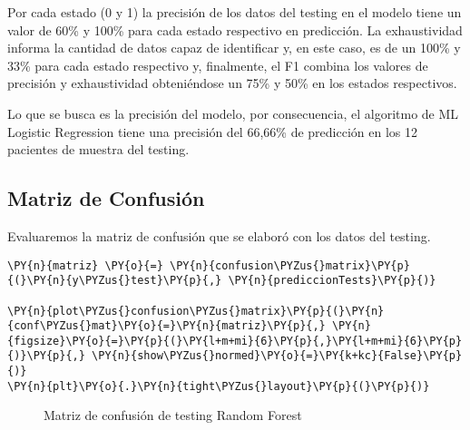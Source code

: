 	Por cada estado (0 y 1) la precisión de los datos del testing en el modelo tiene un valor de 60\%  y 100\% para cada estado respectivo en predicción. La exhaustividad informa la cantidad de datos capaz de identificar y, en este caso, es de un 100\% y 33\% para cada estado respectivo y, finalmente, el F1 combina los valores de precisión y exhaustividad obteniéndose un 75\% y 50\% en los estados respectivos. 
\par Lo que se busca es la precisión del modelo, por consecuencia, el algoritmo de ML Logistic Regression tiene una precisión del 66,66\% de predicción en los 12 pacientes de muestra del testing.\\

    \hypertarget{matriz-de-confusiuxf3n}{%
\subsection{Matriz de Confusión}\label{matriz-de-confusiuxf3n}}

Evaluaremos la matriz de confusión que se elaboró con los datos del testing.

    \begin{tcolorbox}[breakable, size=fbox, boxrule=1pt, pad at break*=1mm,colback=cellbackground, colframe=cellborder]
\begin{Verbatim}[commandchars=\\\{\}]
\PY{n}{matriz} \PY{o}{=} \PY{n}{confusion\PYZus{}matrix}\PY{p}{(}\PY{n}{y\PYZus{}test}\PY{p}{,} \PY{n}{prediccionTests}\PY{p}{)}

\PY{n}{plot\PYZus{}confusion\PYZus{}matrix}\PY{p}{(}\PY{n}{conf\PYZus{}mat}\PY{o}{=}\PY{n}{matriz}\PY{p}{,} \PY{n}{figsize}\PY{o}{=}\PY{p}{(}\PY{l+m+mi}{6}\PY{p}{,}\PY{l+m+mi}{6}\PY{p}{)}\PY{p}{,} \PY{n}{show\PYZus{}normed}\PY{o}{=}\PY{k+kc}{False}\PY{p}{)}
\PY{n}{plt}\PY{o}{.}\PY{n}{tight\PYZus{}layout}\PY{p}{(}\PY{p}{)}
\end{Verbatim}
\end{tcolorbox}

\begin{center}
    	\begin{figure}[H]
	\centering
	\caption{Matriz de confusión de testing Random Forest}
	\label{fig:mctrf}
	\end{figure}
\end{center}
    

